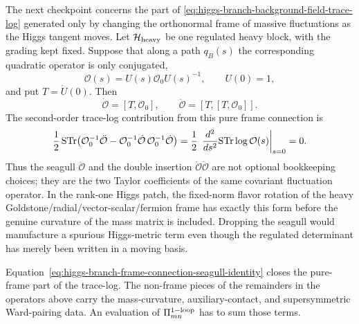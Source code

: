 \begin{example}
\label{ex:higgs-branch-frame-connection-seagull}
The next checkpoint concerns the part of
\eqref{eq:higgs-branch-background-field-trace-log} generated only by changing
the orthonormal frame of massive fluctuations as the Higgs tangent moves.  Let
\({\mathcal H}_{\rm heavy}\) be one regulated heavy block, with the grading kept
fixed.  Suppose that along a path \(q_B(s)\) the corresponding quadratic
operator is only conjugated,
\[
  {\mathcal O}(s)=U(s){\mathcal O}_0U(s)^{-1},\qquad U(0)=1,
\]
and put \(T=\dot U(0)\).  Then
\[
  \dot{\mathcal O}=[T,{\mathcal O}_0],
  \qquad
  \ddot{\mathcal O}=[T,[T,{\mathcal O}_0]] .
\]
The second-order trace-log contribution from this pure frame connection is
\begin{equation}
  \frac12\,{\rm STr}\!
  \left(
    {\mathcal O}_0^{-1}\ddot{\mathcal O}
    -
    {\mathcal O}_0^{-1}\dot{\mathcal O}\,
    {\mathcal O}_0^{-1}\dot{\mathcal O}
  \right)
  =
  \frac12\,\left.\frac{d^2}{ds^2}{\rm STr}\log{\mathcal O}(s)\right|_{s=0}
  =
  0 .
  \label{eq:higgs-branch-frame-connection-seagull-identity}
\end{equation}
Thus the seagull \(\ddot{\mathcal O}\) and the double insertion
\(\dot{\mathcal O}\dot{\mathcal O}\) are not optional bookkeeping choices; they
are the two Taylor coefficients of the same covariant fluctuation operator.  In
the rank-one Higgs patch, the fixed-norm flavor rotation of the heavy
Goldstone/radial/vector-scalar/fermion frame has exactly this form before the
genuine curvature of the mass matrix is included.  Dropping the seagull would
manufacture a spurious Higgs-metric term even though the regulated determinant
has merely been written in a moving basis.

Equation~\eqref{eq:higgs-branch-frame-connection-seagull-identity} closes the
pure-frame part of the trace-log.  The non-frame pieces of the remainders in
the operators above carry the mass-curvature, auxiliary-contact, and
supersymmetric Ward-pairing data.  An evaluation of
\(\Pi_{mn}^{\rm 1-loop}\) has to sum those terms.
\end{example}

